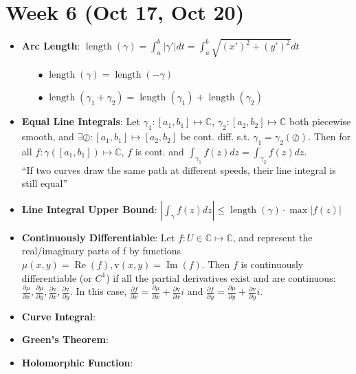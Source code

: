 \documentclass[12pt]{article}
\newcommand{\C}{\mathbb{C}}
\DeclareMathOperator{\real}{Re}
\DeclareMathOperator{\imgn}{Im}
\DeclareMathOperator{\len}{length}
\begin{document}
\section*{Week 6 (Oct 17, Oct 20)}
\begin{itemize}
    \item \textbf{Arc Length}: $\len(\gamma)=\int_a^b|\gamma'|dt=\int_a^b\sqrt{(x')^2+(y')^2}dt$
    \begin{itemize}
        \item[$\bullet$] $\len(\gamma)=\len(-\gamma)$
        \item[$\bullet$] $\len(\gamma_1+\gamma_2)=\len(\gamma_1)+\len(\gamma_2)$
    \end{itemize}
    \item \textbf{Equal Line Integrals}: Let $\gamma_1:[a_1,b_1]\mapsto\C$, $\gamma_2:[a_2,b_2]\mapsto\C$ both piecewise smooth, and $\exists\oslash:[a_1,b_1]\mapsto[a_2,b_2]$ be cont. diff. s.t. $\gamma_1=\gamma_2(\oslash)$. Then for all $f:\gamma([a_1,b_1])\mapsto\C$, $f$ is cont. and $\int_{\gamma_1}f(z)dz=\int_{\gamma_2}f(z)dz$. \\
    ``If two curves draw the same path at different speeds, their line integral is still equal''
    \item \textbf{Line Integral Upper Bound}: $\left|\int_\gamma f(z)dz\right|\leq\len(\gamma)\cdot\max|f(z)|$
    \item \textbf{Continuously Differentiable}: Let $f:U\in\C\mapsto\C$, and represent the real/imaginary parts of f by functions $\mu(x,y)=\real(f),\mathrm{v}(x,y)=\imgn(f)$. Then $f$ is continuously differentiable (or $C^1$) if all the partial derivatives exist and are continuous: $\frac{\partial\mu}{\partial x},\frac{\partial\mu}{\partial y},\frac{\partial\mathrm{v}}{\partial x},\frac{\partial\mathrm{v}}{\partial y}$. In this case, $\frac{\partial f}{\partial x}=\frac{\partial\mu}{\partial x}+\frac{\partial\mathrm{v}}{\partial x}i$ and $\frac{\partial f}{\partial y}=\frac{\partial\mu}{\partial y}+\frac{\partial\mathrm{v}}{\partial y}i$.
    \item \textbf{Curve Integral}: 
    \item \textbf{Green's Theorem}: 
    \item \textbf{Holomorphic Function}:
\end{itemize}
\end{document}
